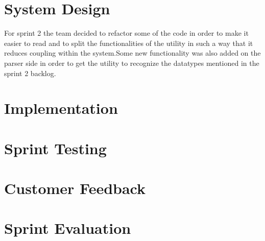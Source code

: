 \section{System Design}
For sprint 2 the team decided to refactor some of the code in order to make it easier to read and to split the functionalities of the utility in such a way that it reduces coupling within the system.Some new functionality was also added on the parser side in order to get the utility to recognize the datatypes mentioned in the sprint 2 backlog.


\section{Implementation}


\section{Sprint Testing}


\section{Customer Feedback}


\section{Sprint Evaluation}


